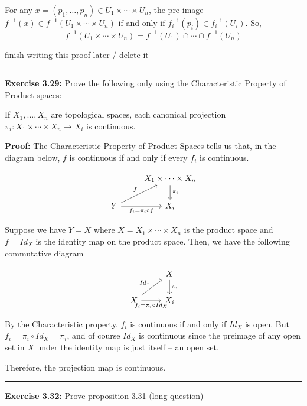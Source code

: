 \documentclass{article}
\begin{document}
\vskip 0.5cm
For any $x = (p_1, \dots, p_n) \in U_1 \times \cdots \times U_n$, the pre-image $f^{-1}(x) \in f^{-1}(U_1 \times \cdots \times U_n)$ if and only if $f_i^{-1}(p_i) \in f_i^{-1}(U_i)$. So,
\[ f^{-1}(U_1 \times \cdots \times U_n) = f^{-1}(U_1) \cap \cdots \cap f^{-1}(U_n) \]

finish writing this proof later / delete it

\vskip 0.5cm
\hrule
\vskip 0.5cm

\textbf{Exercise 3.29:} Prove the following only using the Characteristic Property of Product spaces:
\vskip 0.5cm

If $X_1, \dots, X_n$ are topological spaces, each canonical projection $\pi_i : X_1 \times \cdots \times X_n \rightarrow X_i$ is continuous.

\vskip 0.5cm

\textbf{Proof:} The Characteristic Property of Product Spaces tells us that, in the diagram below, $f$ is continuous if and only if every $f_i$ is continuous.

\[\begin{tikzcd}
	& {X_1 \times \cdots \times X_n} \\
	Y & {X_i}
	\arrow["f", from=2-1, to=1-2]
	\arrow["{f_i = \pi_i \circ f}"', from=2-1, to=2-2]
	\arrow["{\pi_i}", from=1-2, to=2-2]
\end{tikzcd}\]

Suppose we have $Y = X$ where $X = X_1 \times \cdots \times X_n$ is the product space and $f = Id_X$ is the identity map on the product space. Then, we have the following commutative diagram

\[\begin{tikzcd}
	& {X} \\
	X & {X_i}
	\arrow["Id_x", from=2-1, to=1-2]
	\arrow["{f_i = \pi_i \circ Id_X}"', from=2-1, to=2-2]
	\arrow["{\pi_i}", from=1-2, to=2-2]
\end{tikzcd}\]

By the Characteristic property, $f_i$ is continuous if and only if $Id_X$ is open.
But $f_i = \pi_i \circ Id_X = \pi_i$, and of course $Id_X$ is continuous since the preimage of any open set in $X$ under the identity map is just itself -- an open set. 

\vskip 0.5cm
Therefore, the projection map is continuous.

\vskip 0.5cm
\hrule
\vskip 0.5cm

\textbf{Exercise 3.32:} Prove proposition 3.31 (long question)

\vskip 0.5cm
\end{document}
